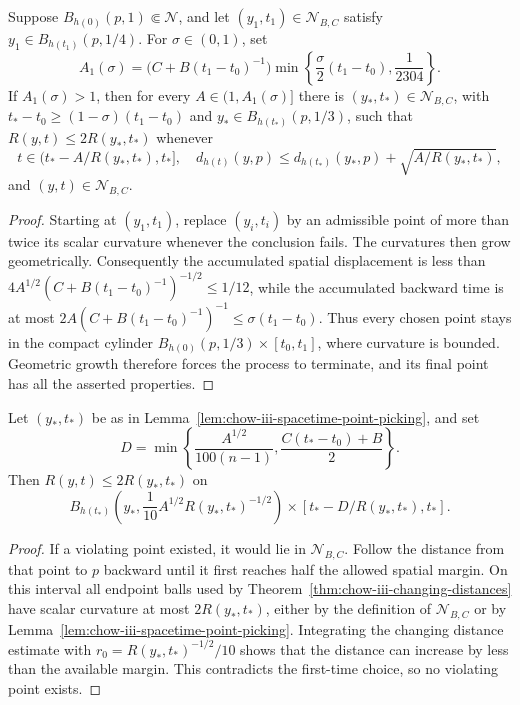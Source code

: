 \begin{lemma}
\label{lem:chow-iii-spacetime-point-picking}
Suppose \(B_{h(0)}(p,1)\Subset\mathcal N\), and let
\((y_1,t_1)\in\mathcal N_{B,C}\) satisfy
\(y_1\in B_{h(t_1)}(p,1/4)\).  For \(\sigma\in(0,1)\), set
\[
 A_1(\sigma)=\bigl(C+B(t_1-t_0)^{-1}\bigr)
 \min\left\{\frac\sigma2(t_1-t_0),\frac1{2304}\right\}.
\]
If \(A_1(\sigma)>1\), then for every \(A\in(1,A_1(\sigma)]\) there is
\((y_*,t_*)\in\mathcal N_{B,C}\), with
\(t_*-t_0\ge(1-\sigma)(t_1-t_0)\) and
\(y_*\in B_{h(t_*)}(p,1/3)\), such that \(R(y,t)\le2R(y_*,t_*)\) whenever
\[
 t\in(t_*-A/R(y_*,t_*),t_*],
 \quad d_{h(t)}(y,p)\le d_{h(t_*)}(y_*,p)+\sqrt{A/R(y_*,t_*)},
\]
and \((y,t)\in\mathcal N_{B,C}\).
\end{lemma}
\begin{proof}
\sketch Starting at \((y_1,t_1)\), replace \((y_i,t_i)\) by an admissible point of
more than twice its scalar curvature whenever the conclusion fails.  The
curvatures then grow geometrically.  Consequently the accumulated spatial
displacement is less than
\(4A^{1/2}(C+B(t_1-t_0)^{-1})^{-1/2}\le1/12\), while the accumulated backward
time is at most \(2A(C+B(t_1-t_0)^{-1})^{-1}\le\sigma(t_1-t_0)\).  Thus every
chosen point stays in the compact cylinder
\(B_{h(0)}(p,1/3)\times[t_0,t_1]\), where curvature is bounded.  Geometric
growth therefore forces the process to terminate, and its final point has all
the asserted properties.
\end{proof}

\begin{proposition}
\label{prop:chow-iii-parabolic-cylinder-curvature-control}
Let \((y_*,t_*)\) be as in
Lemma~\ref{lem:chow-iii-spacetime-point-picking}, and set
\[
 D=\min\left\{\frac{A^{1/2}}{100(n-1)},
 \frac{C(t_*-t_0)+B}{2}\right\}.
\]
Then \(R(y,t)\le2R(y_*,t_*)\) on
\[
 B_{h(t_*)}\left(y_*,\frac1{10}A^{1/2}R(y_*,t_*)^{-1/2}\right)
 \times[t_*-D/R(y_*,t_*),t_*].
\]
\end{proposition}
\begin{proof}
\sketch If a violating point existed, it would lie in \(\mathcal N_{B,C}\).  Follow
the distance from that point to \(p\) backward until it first reaches half the
allowed spatial margin.  On this interval all endpoint balls used by
Theorem~\ref{thm:chow-iii-changing-distances} have scalar curvature at most
\(2R(y_*,t_*)\), either by the definition of \(\mathcal N_{B,C}\) or by
Lemma~\ref{lem:chow-iii-spacetime-point-picking}.  Integrating the changing
distance estimate with \(r_0=R(y_*,t_*)^{-1/2}/10\) shows that the distance can
increase by less than the available margin.  This contradicts the first-time
choice, so no violating point exists.
\end{proof}

